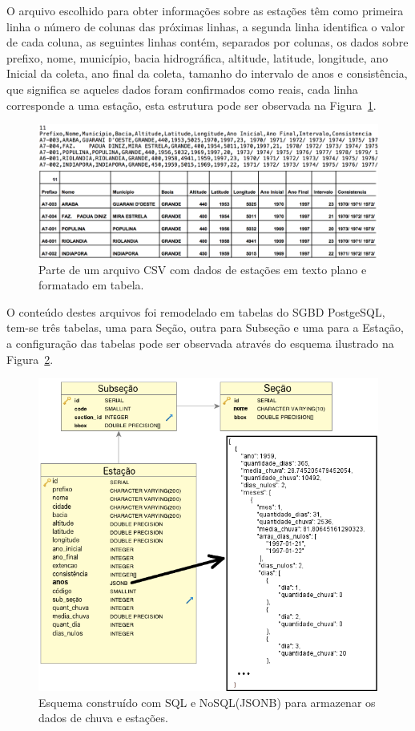 \documentclass[article,11pt,oneside,a4paper]{abntex2} %
\begin{document}
	O arquivo escolhido para obter informações sobre as estações têm como primeira linha o número de colunas das próximas linhas, a segunda linha identifica o valor de cada coluna, as seguintes linhas contém, separados por colunas, os dados sobre prefixo, nome, município, bacia hidrográfica, altitude, latitude, longitude, ano Inicial da coleta, ano final da coleta, tamanho do intervalo de anos e consistência, que significa se aqueles dados foram confirmados como reais, cada linha corresponde a uma estação, esta estrutura pode ser observada na Figura~\ref{csv2}.
	
	\begin{figure}[!h]
		\centering
		\includegraphics[width=1\textwidth]{figuras/csv2_done1}
		\caption{Parte de um arquivo CSV com dados de estações em texto plano e formatado em tabela.}
		\label{csv2}
	\end{figure}

	O conteúdo destes arquivos foi remodelado em tabelas do SGBD PostgeSQL, tem-se três tabelas, uma para Seção, outra para Subseção e uma para a Estação, a configuração das tabelas pode ser observada através do esquema ilustrado na Figura~\ref{schema}.
	
	\begin{figure}[!h]
		\centering
		\includegraphics[width=1\textwidth]{figuras/schema3}
		\caption{Esquema construído com SQL e NoSQL(JSONB) para armazenar os dados de chuva e estações.}
		\label{schema}
	\end{figure}
\end{document}
